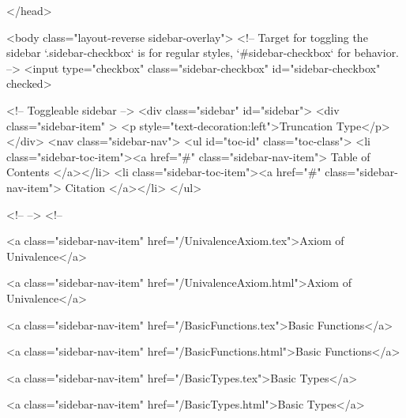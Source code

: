   
</head>




  <body class="layout-reverse sidebar-overlay">
    <!-- Target for toggling the sidebar `.sidebar-checkbox` is for regular
     styles, `#sidebar-checkbox` for behavior. -->
<input type="checkbox" class="sidebar-checkbox" id="sidebar-checkbox" checked>

<!-- Toggleable sidebar -->
<div class="sidebar" id="sidebar">
  <div class="sidebar-item" >
    <p style="text-decoration:left">Truncation Type</p>
  </div>
  <nav class="sidebar-nav">
    <ul id="toc-id" class="toc-class">
  <li class="sidebar-toc-item"><a href="#" class="sidebar-nav-item"> Table of Contents </a></li>
  <li class="sidebar-toc-item"><a href="#" class="sidebar-nav-item"> Citation </a></li>
</ul>


    <!--  -->
    <!-- 
      
    
      
    
      
    
      
    
      
        
      
    
      
        
          <a class="sidebar-nav-item" href="/UnivalenceAxiom.tex">Axiom of Univalence</a>
        
      
    
      
        
          <a class="sidebar-nav-item" href="/UnivalenceAxiom.html">Axiom of Univalence</a>
        
      
    
      
        
          <a class="sidebar-nav-item" href="/BasicFunctions.tex">Basic Functions</a>
        
      
    
      
        
          <a class="sidebar-nav-item" href="/BasicFunctions.html">Basic Functions</a>
        
      
    
      
        
          <a class="sidebar-nav-item" href="/BasicTypes.tex">Basic Types</a>
        
      
    
      
        
          <a class="sidebar-nav-item" href="/BasicTypes.html">Basic Types</a>
        
      
    
